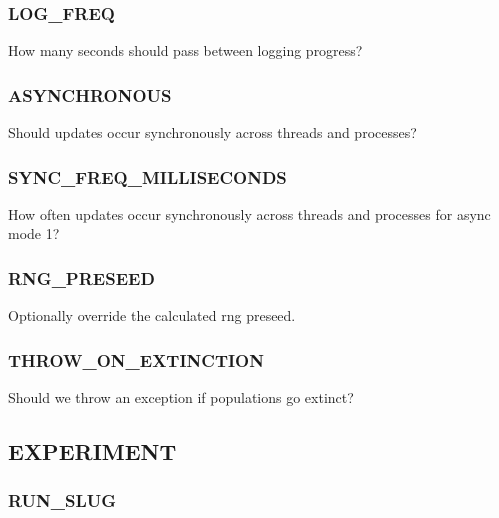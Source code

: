 \subsubsection{LOG\_FREQ}


How many seconds should pass between logging progress?

\subsubsection{ASYNCHRONOUS}


Should updates occur synchronously across threads and processes?

\subsubsection{SYNC\_FREQ\_MILLISECONDS}


How often updates occur synchronously across threads and processes for async mode 1?

\subsubsection{RNG\_PRESEED}


Optionally override the calculated rng preseed.

\subsubsection{THROW\_ON\_EXTINCTION}


Should we throw an exception if populations go extinct?


\subsection{EXPERIMENT}


\subsubsection{RUN\_SLUG}

